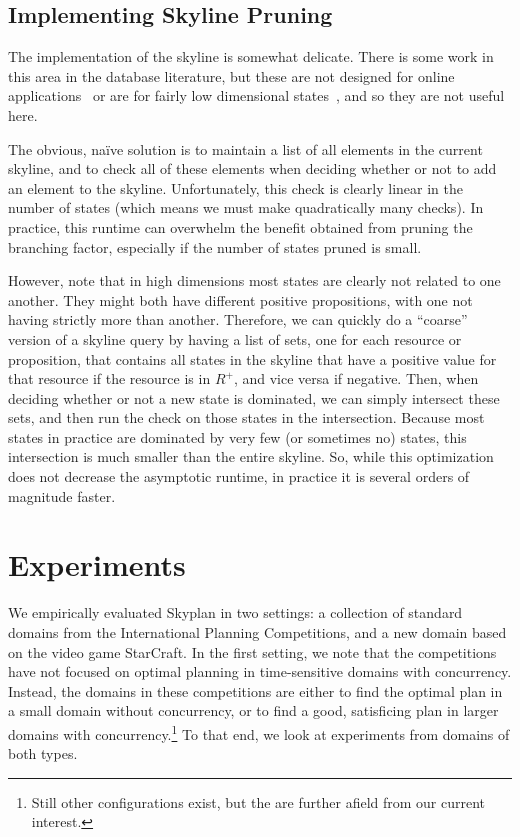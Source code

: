 \documentclass[letterpaper]{article}
\theoremstyle{plain} \newtheorem{theorem}{Theorem} \newtheorem{proposition}{Proposition} \newtheorem{lemma}{Lemma}
\theoremstyle{definition} \newtheorem{definition}{Definition} \newtheorem{conjecture}{Conjecture} \newtheorem*{example}{Example}
\theoremstyle{remark} \newtheorem*{remark}{Remark} \newtheorem*{note}{Note} \newtheorem{case}{Case}
\begin{document}
\subsection{Implementing Skyline Pruning}

The implementation of the skyline is somewhat delicate.  There
is some work in this area in the database literature, but these are
not designed for online applications~\citep{skylineoperator,tan01efficient}
or are for fairly low dimensional states~\citep{KossmannRR02}, and
so they are not useful here.

The obvious, na\"ive solution is to maintain a list of all elements
in the current skyline, and to check all of these elements when
deciding whether or not to add an element to the skyline. Unfortunately,
this check is clearly linear in the number of states (which means
we must make quadratically many checks). In practice, this
runtime can overwhelm the benefit obtained from pruning the branching factor,
especially if the number of states pruned is small.


However, note that in high dimensions most states are clearly not
related to one another.  They might both have different positive
propositions, with one not having strictly more than another.
Therefore, we can quickly do a ``coarse'' version of a skyline query
by having a list of sets, one for each resource or proposition,
that contains all states in the skyline that have a positive value
for that resource if the resource is in $R^+$, and
vice versa if negative. Then, when deciding whether or not a new
state is dominated, we can simply intersect these sets, and then
run the check on those states in the intersection. Because most
states in practice are dominated by very few (or sometimes no)
states, this intersection is much smaller than the entire skyline.
So, while this optimization does not decrease the asymptotic runtime,
in practice it is several orders of magnitude faster.



\section{Experiments}



We empirically evaluated Skyplan in two settings: a collection of standard domains from the International
Planning Competitions, and a new domain based on the video game StarCraft. In the first setting, we note that
the competitions have not focused on optimal planning in time-sensitive domains with concurrency. Instead, the
domains in these competitions are either to find the optimal plan in a small domain without concurrency, or to
find a good, satisficing plan in larger domains with concurrency.\footnote{Still other configurations exist,
but the are further afield from our current interest.} To that end, we look at experiments from domains of both
types.
\end{document}

